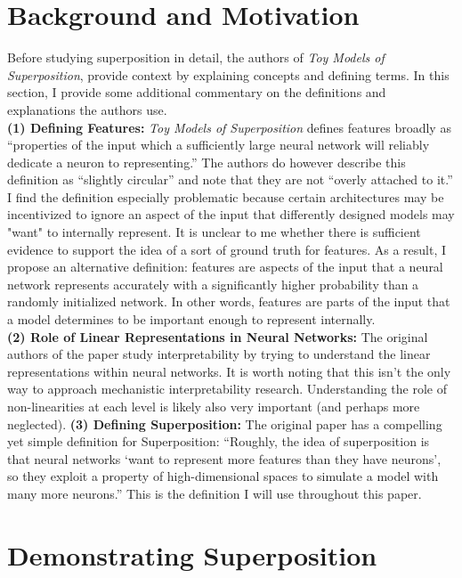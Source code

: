\documentclass{article} %
\begin{document}
\section{Background and Motivation}

Before studying superposition in detail, the authors of  \textit{Toy Models of Superposition}, 
provide context by explaining concepts and defining terms. In this section, I 
provide some additional commentary on the definitions and explanations the authors use. \\

\textbf{(1) Defining Features: }\textit{Toy Models of Superposition}
defines features broadly as ``properties of the input which a sufficiently large 
neural network will reliably dedicate a neuron to representing.'' The authors do
however describe this definition as ``slightly circular'' and note that they are
not ``overly attached to it.'' I find the definition especially problematic because 
certain architectures may be incentivized to ignore an aspect of the input that 
differently designed models may "want" to internally represent. It is unclear to me whether
there is sufficient evidence to support the idea of a sort of ground truth for 
features. As a result, I propose an alternative definition: features are aspects 
of the input that a neural network represents accurately with a significantly higher probability than 
a randomly initialized network. In other words, features are parts of the input 
that a model determines to be important enough to represent internally.\\

\textbf{(2) Role of Linear Representations in Neural Networks: }The original authors
of the paper study interpretability by trying to understand the linear representations
within neural networks. It is worth noting that this isn't the only way to approach
mechanistic interpretability research. Understanding the role of non-linearities 
at each level is likely also very important (and perhaps more neglected).\newline\newline
\textbf{(3) Defining Superposition: } The original paper has a compelling yet
simple definition for Superposition: ``Roughly, the idea of 
superposition is that neural networks `want to represent more features than they 
have neurons', so they exploit a property of high-dimensional spaces to 
simulate a model with many more neurons.'' This is the definition I will use
throughout this paper.

\section{Demonstrating Superposition}
\end{document}
